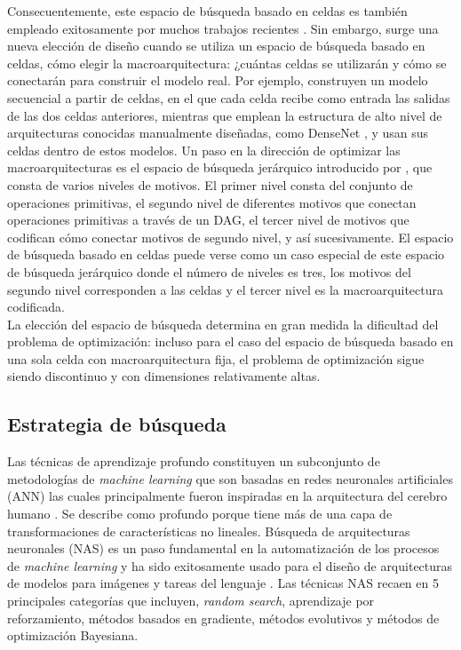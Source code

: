 Consecuentemente, este espacio de búsqueda basado en celdas es también empleado exitosamente por muchos trabajos recientes \parencite{68} \parencite{37} \parencite{62} \parencite{67} \parencite{69}. Sin embargo, surge una nueva elección de diseño cuando se utiliza un espacio de búsqueda basado en celdas, cómo elegir la macroarquitectura: ¿cuántas celdas se utilizarán y cómo se conectarán para construir el modelo real. Por ejemplo, \parencite{56} construyen un modelo secuencial a partir de celdas, en el que cada celda recibe como entrada las salidas de las dos celdas anteriores, mientras que \parencite{69} emplean la estructura de alto nivel de arquitecturas conocidas manualmente diseñadas, como DenseNet \parencite{70}, y usan sus celdas dentro de estos modelos. Un paso en la dirección de optimizar las macroarquitecturas es el espacio de búsqueda jerárquico introducido por \parencite{38}, que consta de varios niveles de motivos. El primer nivel consta del conjunto de operaciones primitivas, el segundo nivel de diferentes motivos que conectan operaciones primitivas a través de un DAG, el tercer nivel de motivos que codifican cómo conectar motivos de segundo nivel, y así sucesivamente. El espacio de búsqueda basado en celdas puede verse como un caso especial de este espacio de búsqueda jerárquico donde el número de niveles es tres, los motivos del segundo nivel corresponden a las celdas y el tercer nivel es la macroarquitectura codificada. \\
La elección del espacio de búsqueda determina en gran medida la dificultad del problema de optimización: incluso para el caso del espacio de búsqueda basado en una sola celda con macroarquitectura fija, el problema de optimización sigue siendo discontinuo y con dimensiones relativamente altas.


\subsection{Estrategia de búsqueda}

Las técnicas de aprendizaje profundo constituyen un subconjunto de metodologías de \textit{machine learning} que son basadas en redes neuronales artificiales (ANN) las cuales principalmente fueron inspiradas en la arquitectura del cerebro humano \parencite{34}. Se describe como profundo porque tiene más de una capa de transformaciones de características no lineales. Búsqueda de arquitecturas neuronales (NAS) es un paso fundamental en la automatización de los procesos de \textit{machine learning} y ha sido exitosamente usado para el diseño de arquitecturas de modelos para imágenes y tareas del lenguaje \parencite{35} \parencite{36} \parencite{37} \parencite{38} \parencite{39}. Las técnicas NAS recaen en 5 principales categorías que incluyen, \textit{random search}, aprendizaje por reforzamiento, métodos basados en gradiente, métodos evolutivos y métodos de optimización Bayesiana.

